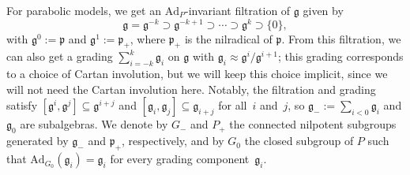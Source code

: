 \documentclass[pdftex]{sigma}
\numberwithin{equation}{section}
\theoremstyle{definition}
\newcommand{\Ad}{\mathrm{Ad}}
\begin{document}
For parabolic models, we get an $\Ad_P$-invariant filtration of $\mathfrak{g}$ given by \[\mathfrak{g}=\mathfrak{g}^{-k}\supset\mathfrak{g}^{-k+1}\supset\cdots\supset\mathfrak{g}^k\supset\{0\},\] with $\mathfrak{g}^0:=\mathfrak{p}$ and $\mathfrak{g}^1:=\mathfrak{p}_+$, where $\mathfrak{p}_+$ is the nilradical of $\mathfrak{p}$. From this filtration, we can also get a grading $\sum_{i=-k}^k\mathfrak{g}_i$ on $\mathfrak{g}$ with $\mathfrak{g}_i\approx\mathfrak{g}^i/\mathfrak{g}^{i+1}$; this grading corresponds to a choice of Cartan involution, but we will keep this choice implicit, since we will not need the Cartan involution here. Notably, the filtration and grading satisfy $[\mathfrak{g}^i,\mathfrak{g}^j]\subseteq\mathfrak{g}^{i+j}$ and $[\mathfrak{g}_i,\mathfrak{g}_j]\subseteq\mathfrak{g}_{i+j}$ for all~$i$ and~$j$, so $\mathfrak{g}_-:=\sum_{i<0}\mathfrak{g}_i$ and $\mathfrak{g}_0$ are subalgebras. We denote by $G_-$ and $P_+$ the connected nilpotent subgroups generated by $\mathfrak{g}_-$ and $\mathfrak{p}_+$, respectively, and by $G_0$ the closed subgroup of $P$ such that $\Ad_{G_0}(\mathfrak{g}_i)=\mathfrak{g}_i$ for every grading component~$\mathfrak{g}_i$.
\end{document}
